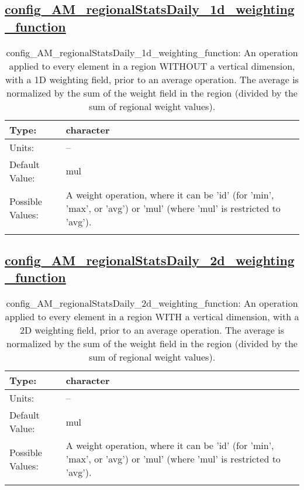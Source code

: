 \subsection[config\_AM\_regionalStatsDaily\_1d\_weighting\_function]{\hyperref[sec:nm_tab_AM_regionalStatsDaily]{config\_AM\_regionalStatsDaily\_1d\_weighting\_function}}
\label{subsec:nm_sec_config_AM_regionalStatsDaily_1d_weighting_function}
\begin{center}
\begin{longtable}{| p{2.0in} || p{4.0in} |}
    \hline
    Type: & character \\
    \hline
    Units: & -- \\
    \hline
    Default Value: & mul \\
    \hline
    Possible Values: & A weight operation, where it can be 'id' (for 'min', 'max', or 'avg') or 'mul' (where 'mul' is restricted to 'avg'). \\
    \hline
    \caption{config\_AM\_regionalStatsDaily\_1d\_weighting\_function: An operation applied to every element in a region WITHOUT a vertical dimension, with a 1D weighting field, prior to an average operation. The average is normalized by the sum of the weight field in the region (divided by the sum of regional weight values).}
\end{longtable}
\end{center}
\subsection[config\_AM\_regionalStatsDaily\_2d\_weighting\_function]{\hyperref[sec:nm_tab_AM_regionalStatsDaily]{config\_AM\_regionalStatsDaily\_2d\_weighting\_function}}
\label{subsec:nm_sec_config_AM_regionalStatsDaily_2d_weighting_function}
\begin{center}
\begin{longtable}{| p{2.0in} || p{4.0in} |}
    \hline
    Type: & character \\
    \hline
    Units: & -- \\
    \hline
    Default Value: & mul \\
    \hline
    Possible Values: & A weight operation, where it can be 'id' (for 'min', 'max', or 'avg') or 'mul' (where 'mul' is restricted to 'avg'). \\
    \hline
    \caption{config\_AM\_regionalStatsDaily\_2d\_weighting\_function: An operation applied to every element in a region WITH a vertical dimension, with a 2D weighting field, prior to an average operation. The average is normalized by the sum of the weight field in the region (divided by the sum of regional weight values).}
\end{longtable}
\end{center}

